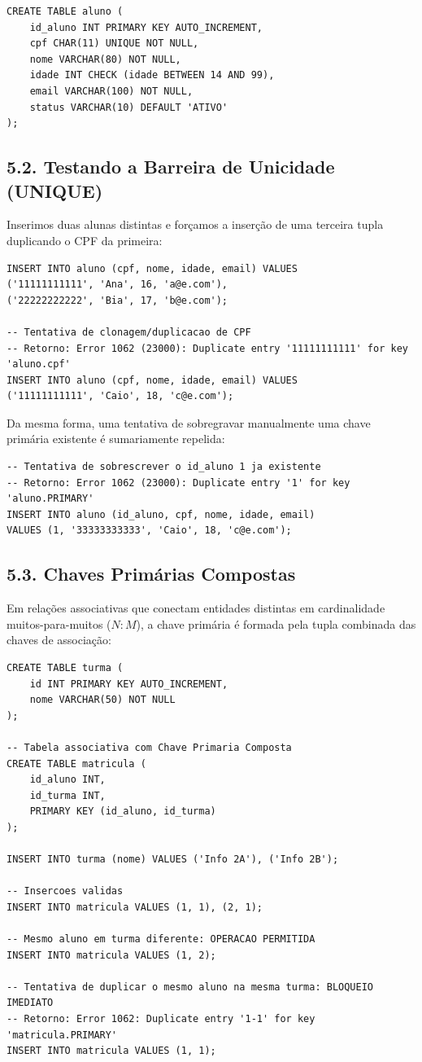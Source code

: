 \begin{lstlisting}
CREATE TABLE aluno (
    id_aluno INT PRIMARY KEY AUTO_INCREMENT,
    cpf CHAR(11) UNIQUE NOT NULL,
    nome VARCHAR(80) NOT NULL,
    idade INT CHECK (idade BETWEEN 14 AND 99),
    email VARCHAR(100) NOT NULL,
    status VARCHAR(10) DEFAULT 'ATIVO'
);
\end{lstlisting}

\subsection*{5.2. Testando a Barreira de Unicidade (UNIQUE)}

Inserimos duas alunas distintas e forçamos a inserção de uma terceira tupla duplicando o CPF da primeira:

\begin{lstlisting}
INSERT INTO aluno (cpf, nome, idade, email) VALUES
('11111111111', 'Ana', 16, 'a@e.com'),
('22222222222', 'Bia', 17, 'b@e.com');

-- Tentativa de clonagem/duplicacao de CPF
-- Retorno: Error 1062 (23000): Duplicate entry '11111111111' for key 'aluno.cpf'
INSERT INTO aluno (cpf, nome, idade, email) VALUES
('11111111111', 'Caio', 18, 'c@e.com');
\end{lstlisting}

Da mesma forma, uma tentativa de sobregravar manualmente uma chave primária existente é sumariamente repelida:
\begin{lstlisting}
-- Tentativa de sobrescrever o id_aluno 1 ja existente
-- Retorno: Error 1062 (23000): Duplicate entry '1' for key 'aluno.PRIMARY'
INSERT INTO aluno (id_aluno, cpf, nome, idade, email)
VALUES (1, '33333333333', 'Caio', 18, 'c@e.com');
\end{lstlisting}

\subsection*{5.3. Chaves Primárias Compostas}

Em relações associativas que conectam entidades distintas em cardinalidade muitos-para-muitos ($N:M$), a chave primária é formada pela tupla combinada das chaves de associação:

\begin{lstlisting}
CREATE TABLE turma (
    id INT PRIMARY KEY AUTO_INCREMENT,
    nome VARCHAR(50) NOT NULL
);

-- Tabela associativa com Chave Primaria Composta
CREATE TABLE matricula (
    id_aluno INT,
    id_turma INT,
    PRIMARY KEY (id_aluno, id_turma)
);

INSERT INTO turma (nome) VALUES ('Info 2A'), ('Info 2B');

-- Insercoes validas
INSERT INTO matricula VALUES (1, 1), (2, 1);

-- Mesmo aluno em turma diferente: OPERACAO PERMITIDA
INSERT INTO matricula VALUES (1, 2);

-- Tentativa de duplicar o mesmo aluno na mesma turma: BLOQUEIO IMEDIATO
-- Retorno: Error 1062: Duplicate entry '1-1' for key 'matricula.PRIMARY'
INSERT INTO matricula VALUES (1, 1);
\end{lstlisting}


